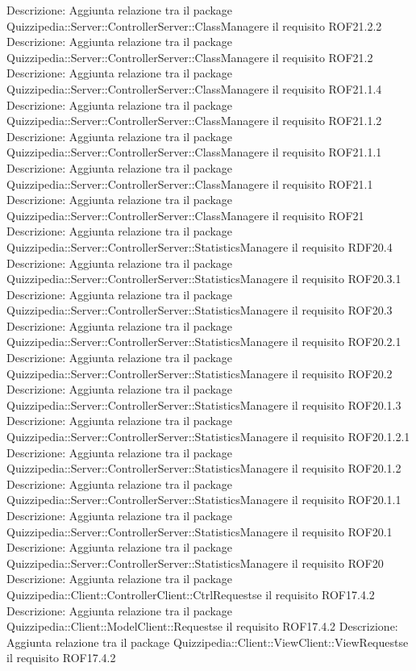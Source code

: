 Descrizione: Aggiunta relazione tra il package Quizzipedia::Server::ControllerServer::ClassManagere il requisito ROF21.2.2 
Descrizione: Aggiunta relazione tra il package Quizzipedia::Server::ControllerServer::ClassManagere il requisito ROF21.2 
Descrizione: Aggiunta relazione tra il package Quizzipedia::Server::ControllerServer::ClassManagere il requisito ROF21.1.4 
Descrizione: Aggiunta relazione tra il package Quizzipedia::Server::ControllerServer::ClassManagere il requisito ROF21.1.2 
Descrizione: Aggiunta relazione tra il package Quizzipedia::Server::ControllerServer::ClassManagere il requisito ROF21.1.1 
Descrizione: Aggiunta relazione tra il package Quizzipedia::Server::ControllerServer::ClassManagere il requisito ROF21.1 
Descrizione: Aggiunta relazione tra il package Quizzipedia::Server::ControllerServer::ClassManagere il requisito ROF21 
Descrizione: Aggiunta relazione tra il package Quizzipedia::Server::ControllerServer::StatisticsManagere il requisito RDF20.4 
Descrizione: Aggiunta relazione tra il package Quizzipedia::Server::ControllerServer::StatisticsManagere il requisito ROF20.3.1 
Descrizione: Aggiunta relazione tra il package Quizzipedia::Server::ControllerServer::StatisticsManagere il requisito ROF20.3 
Descrizione: Aggiunta relazione tra il package Quizzipedia::Server::ControllerServer::StatisticsManagere il requisito ROF20.2.1 
Descrizione: Aggiunta relazione tra il package Quizzipedia::Server::ControllerServer::StatisticsManagere il requisito ROF20.2 
Descrizione: Aggiunta relazione tra il package Quizzipedia::Server::ControllerServer::StatisticsManagere il requisito ROF20.1.3 
Descrizione: Aggiunta relazione tra il package Quizzipedia::Server::ControllerServer::StatisticsManagere il requisito ROF20.1.2.1 
Descrizione: Aggiunta relazione tra il package Quizzipedia::Server::ControllerServer::StatisticsManagere il requisito ROF20.1.2 
Descrizione: Aggiunta relazione tra il package Quizzipedia::Server::ControllerServer::StatisticsManagere il requisito ROF20.1.1 
Descrizione: Aggiunta relazione tra il package Quizzipedia::Server::ControllerServer::StatisticsManagere il requisito ROF20.1 
Descrizione: Aggiunta relazione tra il package Quizzipedia::Server::ControllerServer::StatisticsManagere il requisito ROF20 
Descrizione: Aggiunta relazione tra il package Quizzipedia::Client::ControllerClient::CtrlRequestse il requisito ROF17.4.2 
Descrizione: Aggiunta relazione tra il package Quizzipedia::Client::ModelClient::Requestse il requisito ROF17.4.2 
Descrizione: Aggiunta relazione tra il package Quizzipedia::Client::ViewClient::ViewRequestse il requisito ROF17.4.2 
